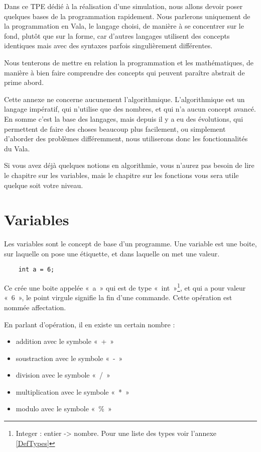 Dans ce TPE dédié à la réalisation d'une simulation, nous allons devoir poser quelques bases de la programmation rapidement. Nous parlerons uniquement de la programmation en Vala, le langage choisi, de manière à se concentrer sur le fond, plutôt que sur la forme, car d'autres langages utilisent des concepts identiques mais avec des syntaxes parfois singulièrement différentes.

Nous tenterons de mettre en relation la programmation et les mathématiques, de manière à bien faire comprendre des concepts qui peuvent paraître abstrait de prime abord.

Cette annexe ne concerne aucunement l'algorithmique. L'algorithmique est un langage impératif, qui n'utilise que des nombres, et qui n'a aucun concept avancé. En somme c'est la base des langages, mais depuis il y a eu des évolutions, qui permettent de faire des choses beaucoup plus facilement, ou simplement d'aborder des problèmes différemment, nous utiliserons donc les fonctionnalités du Vala.

Si vous avez déjà quelques notions en algorithmie, vous n'aurez pas besoin de lire le chapitre sur les variables, mais le chapitre sur les fonctions vous sera utile quelque soit votre niveau.

\section{Variables}
  Les variables sont le concept de base d'un programme. Une variable est une boite, sur laquelle on pose une étiquette, et dans laquelle on met une valeur. 
  \begin{lstlisting}
    int a = 6;
  \end{lstlisting}
  Ce crée une boite appelée «~a~» qui est de type «~int~»\footnote{Integer : entier -> nombre. Pour une liste des types voir l'annexe \ref{DefTypes}}, et qui a pour valeur «~6~», le point virgule signifie la fin d'une commande. Cette opération est nommée affectation.
  
  En parlant d'opération, il en existe un certain nombre : 
  \begin{itemize}
    \item addition avec le symbole «~+~»
    \item soustraction avec le symbole «~-~»
    \item division avec le symbole «~/~»
    \item multiplication avec le symbole «~*~»
    \item modulo avec le symbole «~\%~»
  \end{itemize}
  
